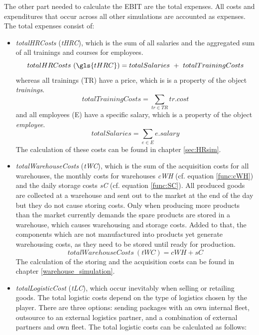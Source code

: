 The other part needed to calculate the EBIT are the total expenses. All costs and expenditures that occur across all other simulations are accounted as expenses. The total expenses consist of:
\begin{itemize}
    \item \textit{totalHRCosts} (\textit{tHRC}), which is the sum of all salaries and the aggregated sum of all trainings and courses for employees. 
    \begin{equation}
        totalHRCosts~(\gls{tHRC}) = totalSalaries \ + \  totalTrainingCosts
    \end{equation}
    whereas all trainings (\gls{TR}) have a price, which is is a property of the object \textit{trainings}.
    \begin{equation}
        totalTrainingCosts = \sum_{tr \in TR} tr.cost
    \end{equation}
    and all employees (\gls{E}) have a specific salary, which is a property of the object \textit{employee}.
     \begin{equation}
        totalSalaries = \sum_{e\in E} e.salary
    \end{equation}
    The calculation of these costs can be found in chapter \ref{sec:HRsim}.
    \item \textit{totalWarehouseCosts} (\textit{tWC}), which is the sum of the acquisition costs %
    for all warehouses, the monthly costs for warehouses \textit{cWH} (cf. equation \ref{func:cWH}) and the daily storage costs \textit{sC} (cf. equation \ref{func:SC}). All produced goods are collected at a warehouse and sent out to the market at the end of the day but they do not cause storing costs. Only when producing more products than the market currently demands the spare products are stored in a warehouse, which causes warehousing and storage costs. Added to that, the components which are not manufactured into products yet generate warehousing costs, as they need to be stored until ready for production. 
    \begin{equation}
        totalWarehouseCosts~(tWC) = cWH + sC
    \end{equation}
    The calculation of the storing and the acquisition costs can be found in chapter \ref{warehouse_simulation}. 
    \item \textit{totalLogisticCost} (\textit{tLC}), which occur inevitably when selling or retailing goods. The total logistic costs depend on the type of logistics chosen by the player. There are three options: sending packages with an own internal fleet, outsource to an external logistics partner, and a combination of external partners and own fleet. The total logistic costs can be calculated as follows:

\end{itemize}
